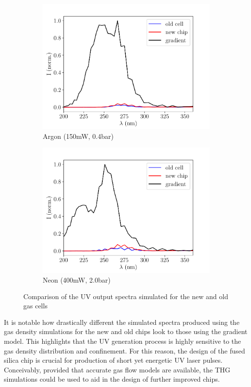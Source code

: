 \documentclass[a4paper]{jpconf}
\begin{document}
\begin{figure}[h]
\centering
 \begin{subfigure}{0.5\textwidth}
\includegraphics[width=\textwidth]{im/Ar_old_v_new_v_grad}
\caption{Argon (150mW, 0.4bar)}\label{im:coms_Ar}
\end{subfigure}
 \begin{subfigure}{0.5\textwidth}
\includegraphics[width=\textwidth]{im/Ne_old_v_new_v_grad}
\caption{Neon (400mW, 2.0bar)}\label{im:coms_Ne}
\end{subfigure}
\caption{Comparison of the UV output spectra simulated for the new and old gas cells}\label{im:coms}
\end{figure}
It is notable how drastically different the simulated spectra produced using the gas density simulations for the new and old chips look to those using the gradient model. This highlights that the UV generation process is highly sensitive to the gas density distribution and confinement. For this reason, the design of the fused silica chip is crucial for production of short yet energetic UV laser pulses. Conceivably, provided that accurate gas flow models are available, the THG simulations could be used to aid in the design of further improved chips. 
\end{document}
